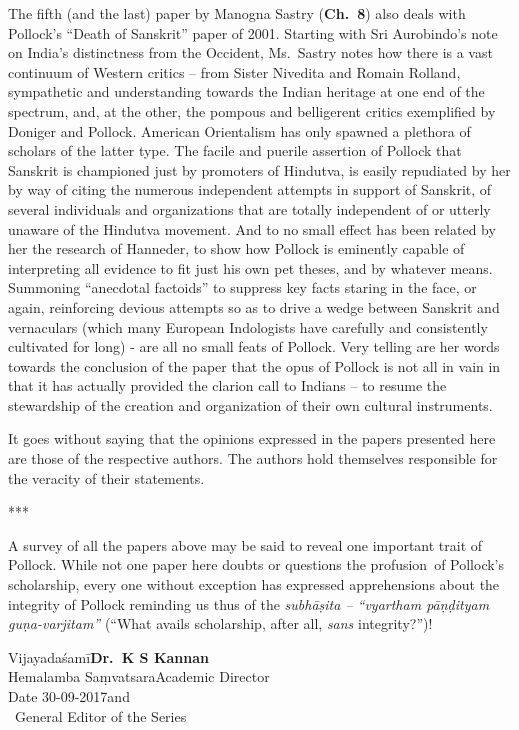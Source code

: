 The fifth (and the last) paper by Manogna Sastry ({\bf Ch.~8}) also deals with Pollock’s “Death of Sanskrit” paper of 2001. Starting with Sri Aurobindo’s note on India’s distinctness from the Occident, Ms.\ Sastry notes how there is a vast continuum of Western critics – from Sister Nivedita and Romain Rolland, sympathetic and understanding towards the Indian heritage at one end of the spectrum, and, at the other, the pompous and belligerent critics exemplified by Doniger and Pollock. American Orientalism has only spawned a plethora of scholars of the latter type. The facile and puerile assertion of Pollock  that Sanskrit is championed just by promoters of Hindutva,  is easily repudiated by her by way of citing the numerous independent attempts in support of Sanskrit,  of several individuals and organizations that are totally independent of or utterly unaware of the Hindutva movement. And to no small effect has been related by her the research of Hanneder, to show how Pollock is eminently capable of interpreting all evidence to fit just his own pet theses, and by whatever means. Summoning “anecdotal factoids” to suppress key facts staring in the face, or again, reinforcing devious attempts so as to drive a wedge between Sanskrit and vernaculars (which many European Indologists have carefully and consistently cultivated for long) - are all no small feats of Pollock. Very telling are her words towards the conclusion of the paper that the opus of Pollock is not all in vain in that it has actually provided the clarion call to Indians – to resume the stewardship of the creation and organization of their own cultural instruments.

It goes without saying that the opinions expressed in the papers presented here are those of the respective authors. The authors hold themselves responsible for the veracity of their statements.

\begin{center}***\end{center}

A survey of all the papers above may be said to reveal one important trait of Pollock. While not one paper here doubts or questions the profusion~of Pollock's scholarship, every one without exception has expressed apprehensions about the integrity of Pollock reminding us thus of the {\sl subhāṣita –  “vyartham pāṇḍityam guṇa-varjitam”} (“What avails scholarship, after all, {\sl sans} integrity?”)! 
\bigskip

\noindent
Vijayadaśamī\hfill	{\bf Dr.~K S Kannan}\\
Hemalamba Saṃvatsara\hfill Academic Director\\
Date 30-09-2017\hfill and\\	
\phantom{.}~\hfill General Editor of the Series  






